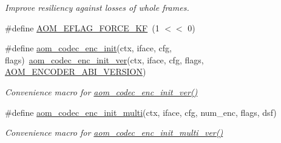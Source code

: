 \begin{DoxyCompactItemize}
\begin{DoxyCompactList}\small\item\em Improve resiliency against losses of whole frames. \end{DoxyCompactList}\item 
\#define \hyperlink{group__encoder_ga86a6a9053205149cccc98481b5460337}{A\+O\+M\+\_\+\+E\+F\+L\+A\+G\+\_\+\+F\+O\+R\+C\+E\+\_\+\+KF}~(1 $<$$<$ 0)
\item 
\#define \hyperlink{group__encoder_gaade68a7d33d30f97dc9a596aa5e065d8}{aom\+\_\+codec\+\_\+enc\+\_\+init}(ctx,  iface,  cfg,  flags)~\hyperlink{group__encoder_ga205cf6f9460f4b4a842872012ef6fb0c}{aom\+\_\+codec\+\_\+enc\+\_\+init\+\_\+ver}(ctx, iface, cfg, flags, \hyperlink{group__encoder_gae4af664f2049d5b7d7b644d9a61d497c}{A\+O\+M\+\_\+\+E\+N\+C\+O\+D\+E\+R\+\_\+\+A\+B\+I\+\_\+\+V\+E\+R\+S\+I\+ON})
\begin{DoxyCompactList}\small\item\em Convenience macro for \hyperlink{group__encoder_ga205cf6f9460f4b4a842872012ef6fb0c}{aom\+\_\+codec\+\_\+enc\+\_\+init\+\_\+ver()} \end{DoxyCompactList}\item 
\#define \hyperlink{group__encoder_ga4410c689b0f8d0b75aca881ff7b25253}{aom\+\_\+codec\+\_\+enc\+\_\+init\+\_\+multi}(ctx,  iface,  cfg,  num\+\_\+enc,  flags,  dsf)
\begin{DoxyCompactList}\small\item\em Convenience macro for \hyperlink{group__encoder_gad3dfb2298402298abadb2c1b059b5f0b}{aom\+\_\+codec\+\_\+enc\+\_\+init\+\_\+multi\+\_\+ver()} \end{DoxyCompactList}\end{DoxyCompactItemize}
